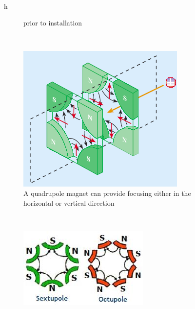 \begin{figure}{h}
\begin{subfigure}[h]{0.450\textwidth}
{          prior to installation \cite{LHC:LHC_lhc_quadrupole_staged_image}}\label{fig:lhc_quadrupole_staged}
      \end{subfigure}
      ~ %
      \begin{subfigure}[h]{0.450\textwidth}
        \includegraphics[width=\textwidth]{Figures/LHC_Diagrams/LHC_Quadrupole_Focusing.png}
        \caption{A quadrupole magnet can provide focusing either in
          the horizontal or vertical direction \cite{LHC:LHC_lhc_quadrupole_focusing_schematic_image}}\label{fig:lhc_quadrupole_field}
      \end{subfigure}
       ~ %
      \begin{subfigure}[h]{0.450\textwidth}
        \includegraphics[width=\textwidth]{Figures/LHC_Diagrams/LHC_MultipoleFields.jpg}

\end{subfigure}
\end{figure}
